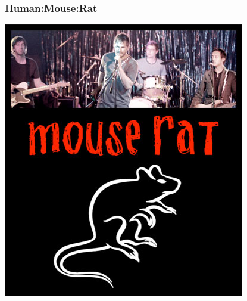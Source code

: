 %
\begin{frame}
  \frametitle{Human:Mouse:Rat}
  \begin{center}
    \includegraphics[height=0.7\textheight]{images/mouse-rat-photo}
  \end{center}
\end{frame}

